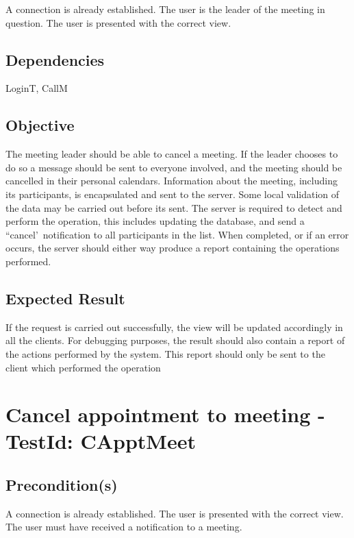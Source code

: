 \documentclass{article}
\begin{document}
A connection is already established. The user is the leader of the meeting
in question. The user is presented with the correct view.

\subsection{Dependencies}

LoginT, CallM

\subsection{Objective}

The meeting leader should be able to cancel a meeting. If the leader chooses
to do so a message should be sent to everyone involved, and the meeting
should be cancelled in their personal calendars. Information about the
meeting, including its participants, is encapsulated and sent to the server.
Some local validation of the data may be carried out before its sent. The
server is required to detect and perform the operation, this includes
updating the database, and send a ``cancel'\ notification to all
participants in the list. When completed, or if an error occurs, the server
should either way produce a report containing the operations performed.

\subsection{Expected Result}

If the request is carried out successfully, the view will be updated
accordingly in all the clients. For debugging purposes, the result should
also contain a report of the actions performed by the system. This report
should only be sent to the client which performed the operation \newpage

\section{Cancel appointment to meeting - TestId: CApptMeet}

\subsection{Precondition(s)}

A connection is already established. The user is presented with the correct
view. The user must have received a notification to a meeting.
\end{document}
